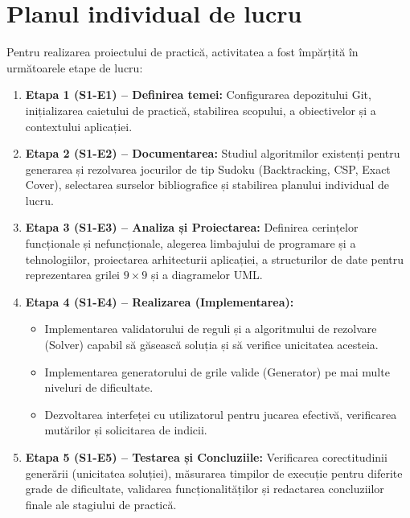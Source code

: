 \section{Planul individual de lucru}
Pentru realizarea proiectului de practică, activitatea a fost împărțită în următoarele etape de lucru:
\begin{enumerate}
    \item \textbf{Etapa 1 (S1-E1) -- Definirea temei:} Configurarea depozitului Git, inițializarea caietului de practică, stabilirea scopului, a obiectivelor și a contextului aplicației.
    \item \textbf{Etapa 2 (S1-E2) -- Documentarea:} Studiul algoritmilor existenți pentru generarea și rezolvarea jocurilor de tip Sudoku (Backtracking, CSP, Exact Cover), selectarea surselor bibliografice și stabilirea planului individual de lucru.
    \item \textbf{Etapa 3 (S1-E3) -- Analiza și Proiectarea:} Definirea cerințelor funcționale și nefuncționale, alegerea limbajului de programare și a tehnologiilor, proiectarea arhitecturii aplicației, a structurilor de date pentru reprezentarea grilei $9 \times 9$ și a diagramelor UML.
    \item \textbf{Etapa 4 (S1-E4) -- Realizarea (Implementarea):} 
    \begin{itemize}
        \item Implementarea validatorului de reguli și a algoritmului de rezolvare (Solver) capabil să găsească soluția și să verifice unicitatea acesteia.
        \item Implementarea generatorului de grile valide (Generator) pe mai multe niveluri de dificultate.
        \item Dezvoltarea interfeței cu utilizatorul pentru jucarea efectivă, verificarea mutărilor și solicitarea de indicii.
    \end{itemize}
    \item \textbf{Etapa 5 (S1-E5) -- Testarea și Concluziile:} Verificarea corectitudinii generării (unicitatea soluției), măsurarea timpilor de execuție pentru diferite grade de dificultate, validarea funcționalităților și redactarea concluziilor finale ale stagiului de practică.
\end{enumerate}